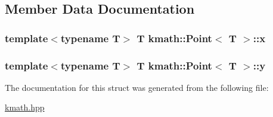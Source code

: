 \subsection{Member Data Documentation}
\hypertarget{structkmath_1_1_point_a367f7e04a97fde0889e5dea495d98acd}{
\subsubsection[{x}]{\setlength{\rightskip}{0pt plus 5cm}template$<$typename T$>$ T {\bf kmath\-::\-Point}$<$ T $>$\-::{\bf x}}}\label{structkmath_1_1_point_a367f7e04a97fde0889e5dea495d98acd}
\hypertarget{structkmath_1_1_point_a9d69fcd8c019e361cce763e45b8b1698}{
\subsubsection[{y}]{\setlength{\rightskip}{0pt plus 5cm}template$<$typename T$>$ T {\bf kmath\-::\-Point}$<$ T $>$\-::{\bf y}}}\label{structkmath_1_1_point_a9d69fcd8c019e361cce763e45b8b1698}


The documentation for this struct was generated from the following file\-:\begin{DoxyCompactItemize}
\item 
\hyperlink{kmath_8hpp}{kmath.\-hpp}\end{DoxyCompactItemize}
